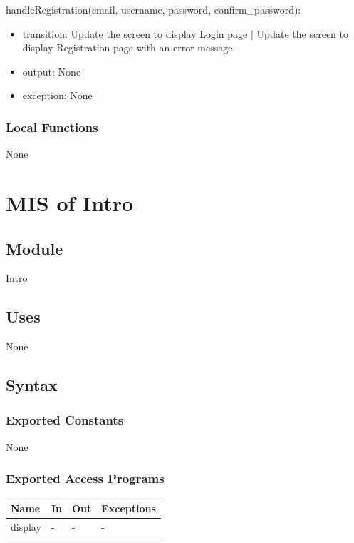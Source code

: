 \documentclass[12pt, titlepage]{article}
\begin{document}
\noindent handleRegistration(email, username, password, confirm\_password):
\begin{itemize}
\item transition: Update the screen to display Login page $|$ Update the screen to display
Registration page with an error message.
\item output: None
\item exception: None

\end{itemize}

\subsubsection{Local Functions}

None

\newpage

\section{MIS of Intro} \label{IntroModule}

\subsection{Module}

Intro

\subsection{Uses}

None

\subsection{Syntax}

\subsubsection{Exported Constants}

None

\subsubsection{Exported Access Programs}

\begin{center}
\begin{tabular}{p{2cm} p{4cm} p{4cm} p{2cm}}
\hline
\textbf{Name} & \textbf{In} & \textbf{Out} & \textbf{Exceptions} \\
\hline
display & - & - & - \\
\hline
\end{tabular}
\end{center}
\end{document}
